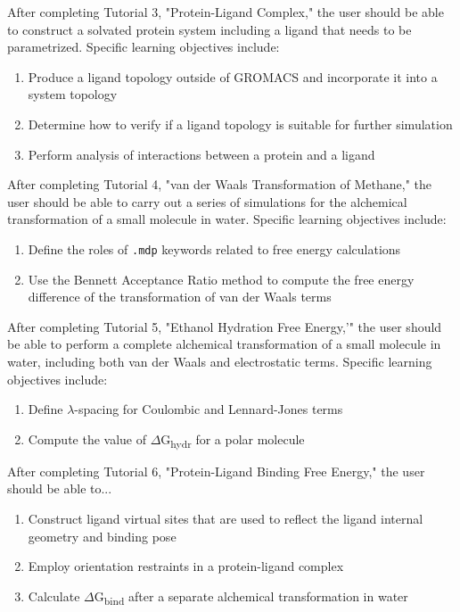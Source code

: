 \documentclass[9pt,tutorial,pubversion]{livecoms}
\begin{document}
After completing Tutorial 3, "Protein-Ligand Complex," the user should be able to construct a solvated protein system including a ligand that needs to be parametrized. Specific learning objectives include:
\begin{enumerate}
	\item Produce a ligand topology outside of GROMACS and incorporate it into a system topology
	\item Determine how to verify if a ligand topology is suitable for further simulation
	\item Perform analysis of interactions between a protein and a ligand
\end{enumerate}

After completing Tutorial 4, "van der Waals Transformation of Methane," the user should be able to carry out a series of simulations for the alchemical transformation of a small molecule in water. Specific learning objectives include:
\begin{enumerate}
	\item Define the roles of \texttt{.mdp} keywords related to free energy calculations
	\item Use the Bennett Acceptance Ratio method to compute the free energy difference of the transformation of van der Waals terms
\end{enumerate}

After completing Tutorial 5, "Ethanol Hydration Free Energy,'" the user should be able to perform a complete alchemical transformation of a small molecule in water, including both van der Waals and electrostatic terms. Specific learning objectives include:
\begin{enumerate}
	\item Define $\lambda$-spacing for Coulombic and Lennard-Jones terms
	\item Compute the value of $\Delta$G\textsubscript{hydr} for a polar molecule
\end{enumerate}

After completing Tutorial 6, "Protein-Ligand Binding Free Energy," the user should be able to...
\begin{enumerate}
	\item Construct ligand virtual sites that are used to reflect the ligand internal geometry and binding pose
	\item Employ orientation restraints in a protein-ligand complex
	\item Calculate $\Delta$G\textsubscript{bind} after a separate alchemical transformation in water
\end{enumerate}
\end{document}
